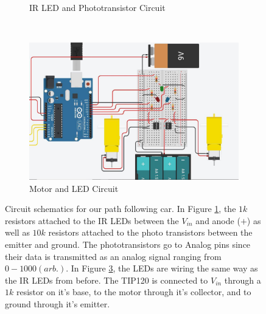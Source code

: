 \documentclass[twocolumn]{article}
\begin{document}
\begin{flushleft}
\begin{figure}[!htb]
			{\begin{subfigure}[b]{0.45\textwidth}
				\caption{IR LED and Phototransistor Circuit}
				\label{fig:circuitSensors}
			\end{subfigure}\\ \vspace{1em}%
			\begin{subfigure}[b]{0.45\textwidth}
				\includegraphics[width=1\columnwidth, keepaspectratio]{CircuitMotors.jpg}
				\caption{Motor and LED Circuit}
				\label{fig:circuitMotors}
			\end{subfigure}
			
			\caption{Circuit schematics for our path following car. In Figure \ref{fig:circuitSensors}, the $1k$ resistors attached to the IR LEDs between the $V_{in}$ and anode ($+$) as well as $10k$ resistors attached to the photo transistors between the emitter and ground. The phototransistors go to Analog pins since their data is transmitted as an analog signal ranging from $0-1000 (arb.)$. In Figure \ref{fig:circuitMotors}, the LEDs are wiring the same way as the IR LEDs from before. The TIP120 is connected to $V_{in}$ through a $1k$ resistor on it's base, to the motor through it's collector, and to ground through it's emitter.}
}
		\end{figure}
		

\end{flushleft}
\end{document}
